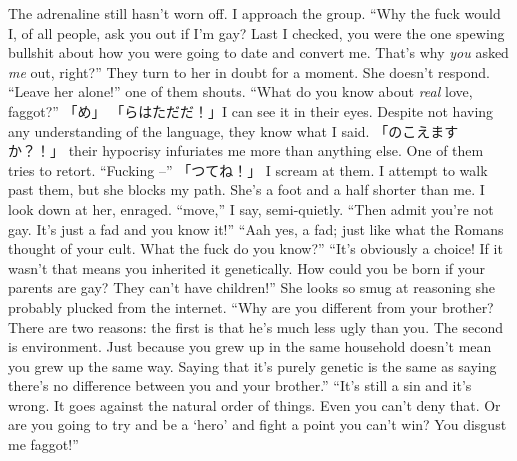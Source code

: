 \documentclass[a4paper, 12pt]{book}
\begin{document}
\begin{CJK*}{UTF8}{min}
\newline
\tab
The adrenaline still hasn’t worn off. I approach the group. ``Why the fuck would I, of all people, ask you out if I’m gay? Last I checked, you were the one spewing bullshit about how you were going to date and convert me. That’s why \textit{you} asked \textit{me} out, right?'' They turn to her in doubt for a moment. She doesn’t respond.
\newline
\tab
``Leave her alone!'' one of them shouts. ``What do you know about \textit{real} love, faggot?''
\newline
\tab
「め」 「らはただだ！」I can see it in their eyes. Despite not having any understanding of the language, they know what I said. 「のこえますか？！」 their hypocrisy infuriates me more than anything else. 
\newline
\tab
One of them tries to retort. ``Fucking --''
\newline
\tab
「つてね！」 I scream at them. I attempt to walk past them, but she blocks my path. She’s a foot and a half shorter than me. I look down at her, enraged. ``move,'' I say, semi-quietly.
\newline
\tab
``Then admit you’re not gay. It’s just a fad and you know it!''
\newline
\tab
``Aah yes, a fad; just like what the Romans thought of your cult. What the fuck do you know?''
\newline
\tab
``It’s obviously a choice! If it wasn’t that means you inherited it genetically. How could you be born if your parents are gay? They can’t have children!'' She looks so smug at reasoning she probably plucked from the internet.
\newline
\tab
``Why are you different from your brother? There are two reasons: the first is that he’s much less ugly than you. The second is environment. Just because you grew up in the same household doesn’t mean you grew up the same way. Saying that it’s purely genetic is the same as saying there’s no difference between you and your brother.''
\newline
\tab
``It’s still a sin and it’s wrong. It goes against the natural order of things. Even you can’t deny that. Or are you going to try and be a ‘hero’ and fight a point you can’t win? You disgust me faggot!'' 
\newline

\end{CJK*}
\end{document}
